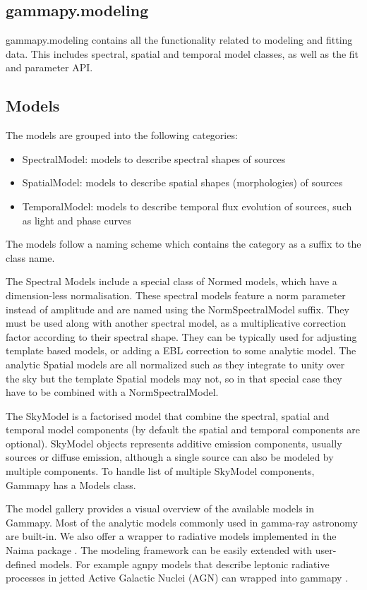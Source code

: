 \subsection{gammapy.modeling}
\label{ssec:gammapy-modeling}

gammapy.modeling contains all the functionality related to modeling and fitting data. This includes spectral, spatial and temporal model classes, as well as the fit and parameter API.

\subsection{Models}
\label{ssec:models}

The models are grouped into the following categories:
\begin{itemize}
	\item SpectralModel: models to describe spectral shapes of sources
	\item SpatialModel: models to describe spatial shapes (morphologies) of sources
	\item TemporalModel: models to describe temporal flux evolution of sources, such as light and phase curves
\end{itemize}
The models follow a naming scheme which contains the category as a suffix to the class name.

The  Spectral Models include a special class of Normed models, which have a dimension-less normalisation. These spectral models feature a norm parameter instead of amplitude and are named using the NormSpectralModel suffix. They must be used along with another spectral model, as a multiplicative correction factor according to their spectral shape. They can be typically used for adjusting template based models, or adding a EBL correction to some analytic model. The analytic Spatial models are all normalized such as they integrate to unity over the sky but the template Spatial models may not, so in that special case they have to be combined with a NormSpectralModel.

The SkyModel is a factorised model that combine the spectral, spatial and temporal model components (by default the spatial and temporal components are optional).
SkyModel objects represents additive emission components, usually sources or diffuse emission, although a single source can also be modeled by multiple components.
To handle list of multiple SkyModel components, Gammapy has a Models class.

The model gallery provides a visual overview of the available models in Gammapy.
Most of the analytic models  commonly used in gamma-ray astronomy are built-in. We also offer a wrapper to radiative models implemented in the Naima package \cite{naima}. The modeling framework can be easily extended with user-defined models. For example agnpy models that describe leptonic radiative processes in jetted Active Galactic Nuclei (AGN) can wrapped into gammapy \citep[see section3.5 of ][]{2021arXiv211214573N} .

